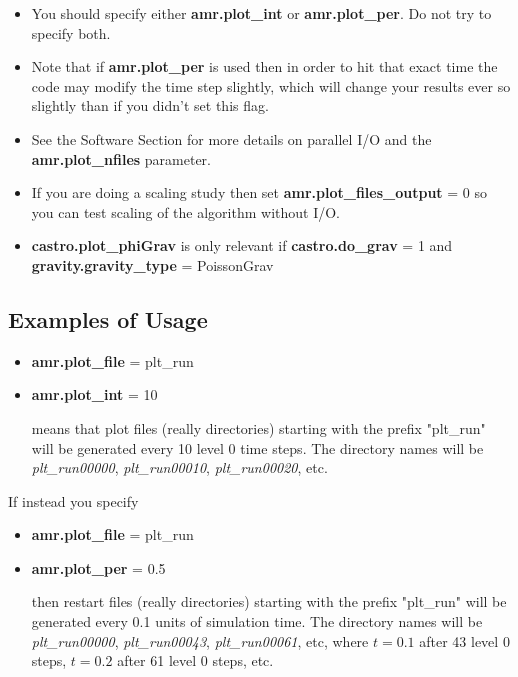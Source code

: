 \begin{itemize}

\item You should specify either {\bf amr.plot\_int} or {\bf amr.plot\_per}.  Do not try to specify both. 

\item Note that if {\bf amr.plot\_per} is used then in order to hit that exact time the 
code may modify the time step slightly, which will change your results ever so slightly 
than if you didn't set this flag.

\item See the Software Section for more details on parallel I/O and the 
{\bf amr.plot\_nfiles} parameter.

\item If you are doing a scaling study then set {\bf amr.plot\_files\_output} = 0
so you can test scaling of the algorithm without I/O.

\item {\bf castro.plot\_phiGrav} is only relevant if 
{\bf castro.do\_grav} = 1 and {\bf gravity.gravity\_type} = PoissonGrav

\end{itemize}

\subsection{Examples of Usage}

\begin{itemize}

\item {\bf amr.plot\_file} = plt\_run
\item {\bf amr.plot\_int} = 10

means that plot files (really directories) starting with the prefix "plt\_run" will be
generated every 10 level 0 time steps.  The directory names will be {\it plt\_run00000}, 
{\it plt\_run00010}, {\it plt\_run00020}, etc.

\end{itemize}

If instead you specify

\begin{itemize}

\item {\bf amr.plot\_file} = plt\_run
\item {\bf amr.plot\_per} = 0.5

then restart files (really directories) starting with the prefix "plt\_run" will be
generated every 0.1 units of simulation time.  The directory names will be {\it plt\_run00000}, 
{\it plt\_run00043}, {\it plt\_run00061}, etc, where $t = 0.1$ after 43 level 0 steps, 
$t = 0.2$ after 61 level 0 steps, etc.

\end{itemize}

